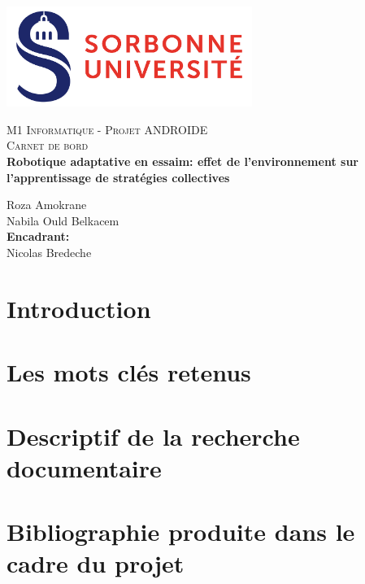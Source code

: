 \documentclass[11pt]{article}
\begin{document}
  \center \includegraphics[width=8cm]{logo.png}

\begin{center}
\textsc{\Large M1 Informatique - Projet ANDROIDE}\\[0.5cm]
\textsc{\Large  Carnet de bord }\\[0.5cm]
\textbf{Robotique adaptative en essaim: effet de l'environnement sur l'apprentissage de stratégies collectives} \\[3cm]
\end{center}


\begin{center}
Roza Amokrane\\[0.3cm]
Nabila Ould Belkacem\\[0.8cm]
\textbf{Encadrant:}\\
Nicolas Bredeche \\[0.4cm]
\end{center}


\newpage
\tableofcontents
\newpage

\begin{flushleft}
\section{Introduction}

\section{Les mots clés retenus}

\section{Descriptif de la recherche documentaire}


\section{Bibliographie produite dans le cadre du projet}
\end{flushleft}
\end{document}

